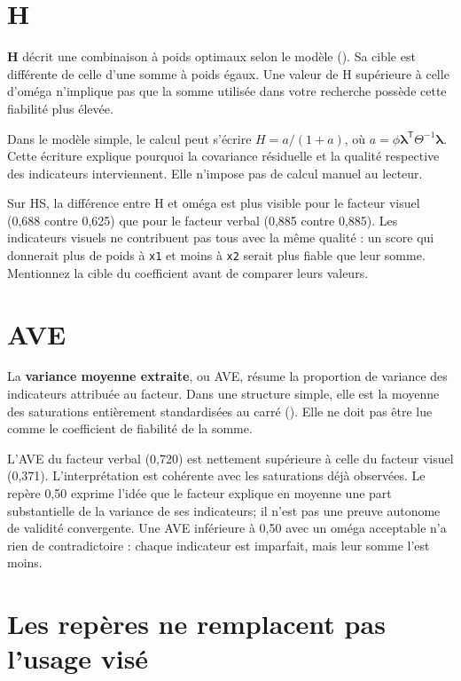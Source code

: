 \documentclass[
  french,
  11pt,
  a4paper,
  DIV=11,
  numbers=noendperiod]{scrreprt}
\begin{document}
\section{H}\label{h}

\textbf{H} décrit une combinaison à poids optimaux selon le modèle
(). Sa cible est
différente de celle d'une somme à poids égaux. Une valeur de H
supérieure à celle d'oméga n'implique pas que la somme utilisée dans
votre recherche possède cette fiabilité plus élevée.

Dans le modèle simple, le calcul peut s'écrire \(H=a/(1+a)\), où
\(a=\phi\boldsymbol{\lambda}^{\mathsf T}\Theta^{-1}\boldsymbol{\lambda}\).
Cette écriture explique pourquoi la covariance résiduelle et la qualité
respective des indicateurs interviennent. Elle n'impose pas de calcul
manuel au lecteur.

Sur HS, la différence entre H et oméga est plus visible pour le facteur
visuel (0,688 contre 0,625) que pour le facteur verbal (0,885 contre
0,885). Les indicateurs visuels ne contribuent pas tous avec la même
qualité : un score qui donnerait plus de poids à \texttt{x1} et moins à
\texttt{x2} serait plus fiable que leur somme. Mentionnez la cible du
coefficient avant de comparer leurs valeurs.

\section{AVE}\label{ave}

La \textbf{variance moyenne extraite}, ou AVE, résume la proportion de
variance des indicateurs attribuée au facteur. Dans une structure
simple, elle est la moyenne des saturations entièrement standardisées au
carré (). Elle ne
doit pas être lue comme le coefficient de fiabilité de la somme.

L'AVE du facteur verbal (0,720) est nettement supérieure à celle du
facteur visuel (0,371). L'interprétation est cohérente avec les
saturations déjà observées. Le repère 0,50 exprime l'idée que le facteur
explique en moyenne une part substantielle de la variance de ses
indicateurs; il n'est pas une preuve autonome de validité convergente.
Une AVE inférieure à 0,50 avec un oméga acceptable n'a rien de
contradictoire : chaque indicateur est imparfait, mais leur somme l'est
moins.

\section{Les repères ne remplacent pas l'usage
visé}\label{les-repuxe8res-ne-remplacent-pas-lusage-visuxe9}
\end{document}
